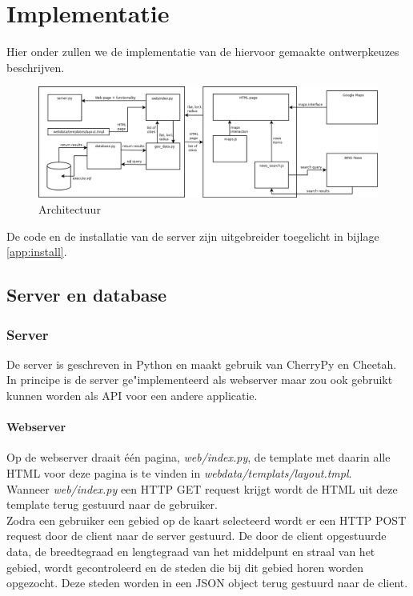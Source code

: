 \documentclass[twoside,openright]{uva-bachelor-thesis}
\begin{document}
\chapter{Implementatie}
	Hier onder zullen we de implementatie van de hiervoor gemaakte ontwerpkeuzes beschrijven.
	\begin{figure}[!htb]
		\label{fig:arch}
		\centering
		\includegraphics[scale=0.3]{./img/architecture.png}
		\caption{Architectuur}
	\end{figure}
	De code en de installatie van de server zijn uitgebreider toegelicht in bijlage \ref{app:install}.
	\section{Server en database}
		\subsection{Server}
		De server is geschreven in Python en maakt gebruik van CherryPy en Cheetah. In principe is de server ge"implementeerd als webserver maar zou ook gebruikt kunnen worden als API \cite{API} voor een andere applicatie.
		
		\subsubsection{Webserver}
		Op de webserver draait \'e\'en pagina, \textit{web/index.py}, de template met daarin alle HTML voor deze pagina is te vinden in \textit{webdata/templats/layout.tmpl}.
		\\[0.5cm]
		Wanneer \textit{web/index.py} een HTTP GET request \cite{HTTP} krijgt wordt de HTML uit deze template terug gestuurd naar de gebruiker.
		\\[0.5cm]
		Zodra een gebruiker een gebied op de kaart selecteerd wordt er een HTTP POST request door de client naar de server gestuurd. De door de client opgestuurde data, de breedtegraad en lengtegraad van het middelpunt en straal van het gebied, wordt gecontroleerd en de steden die bij dit gebied horen worden opgezocht. Deze steden worden in een JSON object terug gestuurd naar de client.
\end{document}
